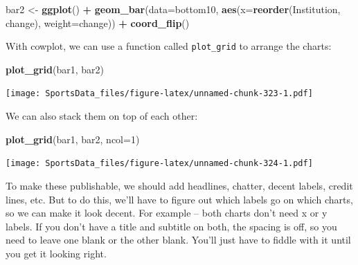 \documentclass[]{book}
\newenvironment{Shaded}{\begin{snugshade}}{\end{snugshade}}
\newcommand{\DataTypeTok}[1]{\textcolor[rgb]{0.13,0.29,0.53}{#1}}
\newcommand{\DecValTok}[1]{\textcolor[rgb]{0.00,0.00,0.81}{#1}}
\newcommand{\KeywordTok}[1]{\textcolor[rgb]{0.13,0.29,0.53}{\textbf{#1}}}
\newcommand{\NormalTok}[1]{#1}
\newcommand{\OperatorTok}[1]{\textcolor[rgb]{0.81,0.36,0.00}{\textbf{#1}}}
\newcommand{\StringTok}[1]{\textcolor[rgb]{0.31,0.60,0.02}{#1}}
\begin{document}
\begin{Shaded}
\begin{Highlighting}[]
\NormalTok{bar2 <-}\StringTok{ }\KeywordTok{ggplot}\NormalTok{() }\OperatorTok{+}\StringTok{ }\KeywordTok{geom_bar}\NormalTok{(}\DataTypeTok{data=}\NormalTok{bottom10, }\KeywordTok{aes}\NormalTok{(}\DataTypeTok{x=}\KeywordTok{reorder}\NormalTok{(Institution, change), }\DataTypeTok{weight=}\NormalTok{change)) }\OperatorTok{+}\StringTok{ }\KeywordTok{coord_flip}\NormalTok{()}
\end{Highlighting}
\end{Shaded}

With cowplot, we can use a function called \texttt{plot\_grid} to arrange the charts:

\begin{Shaded}
\begin{Highlighting}[]
\KeywordTok{plot_grid}\NormalTok{(bar1, bar2) }
\end{Highlighting}
\end{Shaded}

\texttt{[image: SportsData\_files/figure-latex/unnamed-chunk-323-1.pdf]}

We can also stack them on top of each other:

\begin{Shaded}
\begin{Highlighting}[]
\KeywordTok{plot_grid}\NormalTok{(bar1, bar2, }\DataTypeTok{ncol=}\DecValTok{1}\NormalTok{) }
\end{Highlighting}
\end{Shaded}

\texttt{[image: SportsData\_files/figure-latex/unnamed-chunk-324-1.pdf]}

To make these publishable, we should add headlines, chatter, decent labels, credit lines, etc. But to do this, we'll have to figure out which labels go on which charts, so we can make it look decent. For example -- both charts don't need x or y labels. If you don't have a title and subtitle on both, the spacing is off, so you need to leave one blank or the other blank. You'll just have to fiddle with it until you get it looking right.
\end{document}
